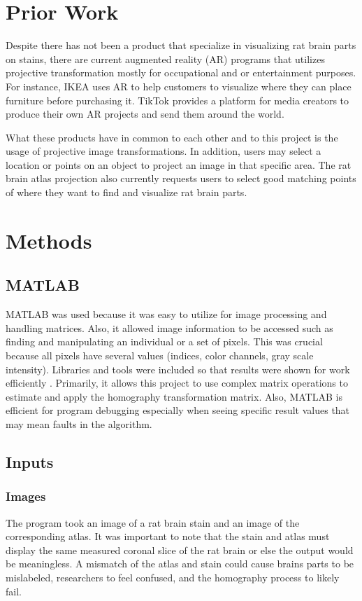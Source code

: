 \documentclass[10pt,twocolumn]{article}
\begin{document}
\section{Prior Work}
Despite there has not been a product that specialize in visualizing rat brain parts on stains, there are current augmented reality (AR) programs that utilizes projective transformation mostly for occupational and or entertainment purposes. For instance, IKEA uses AR to help customers to visualize where they can place furniture before purchasing it. TikTok provides a platform for media creators to produce their own AR projects and send them around the world. 

What these products have in common to each other and to this project is the usage of projective image transformations. In addition, users may select a location or points on an object to project an image in that specific area. The rat brain atlas projection also currently requests users to select good matching points of where they want to find and visualize rat brain parts. 

\section{Methods}
\subsection{MATLAB}
MATLAB was used because it was easy to utilize for image processing and handling matrices. Also, it allowed image information to be accessed such as finding and manipulating an individual or a set of pixels. This was crucial because all pixels have several values (indices, color channels, gray scale intensity). Libraries and tools were included so that results were shown for work efficiently \cite{mat}. Primarily, it allows this project to use complex matrix operations to estimate and apply the homography transformation matrix. Also, MATLAB is efficient for program debugging especially when seeing specific result values that may mean faults in the algorithm. 

\subsection{Inputs}
\subsubsection{Images}
The program took an image of a rat brain stain and an image of the corresponding atlas. It was important to note that the stain and atlas must display the same measured coronal slice of the rat brain or else the output would be meaningless. A mismatch of the atlas and stain could cause brains parts to be mislabeled, researchers to feel confused, and the homography process to likely fail.
\end{document}
